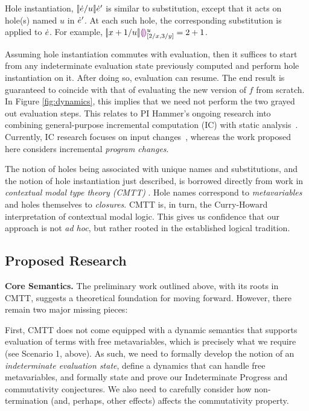 Hole instantiation, $[\!| \dot{e} / u |\!]\dot{e}'$ is similar to substitution, except that it acts on
 hole(s) named $u$ in $\dot{e}'$. At each such hole, the corresponding substitution is applied to $\dot{e}$. For example,
$[\!| x + 1 / u |\!]\textcolor{violet}{\llparenthesis}\textcolor{violet}{\rrparenthesis}{}^u_{[2/x, 3/y]} = 2 + 1$. 

Assuming hole instantiation commutes with evaluation, then it suffices to start from any indeterminate evaluation 
state previously computed and perform hole instantiation on it. After doing so, evaluation can resume. The end result is guaranteed to coincide with that of evaluating the new version of $f$ from scratch. In Figure \ref{fig:dynamics}, this implies that we need not perform the two grayed out evaluation steps. This relates to PI Hammer's
ongoing research into combining general-purpose incremental
computation (IC) with static analysis~\cite{OVV2016}. 
%
Currently, IC research focuses on input
changes~\citep{TypedAdapton2016, Fisher2016, Hammer2015, Chen2014,
Hammer2014, Chen2011, Hammer2011, Hammer2009, Hammer2008}, whereas the
work proposed here considers incremental \emph{program changes}.

The notion of holes being associated with unique names and substitutions, and the notion of hole instantiation just described, is borrowed directly from work in \emph{contextual modal type theory (CMTT)} \cite{Nanevski2008}. Hole names correspond to \emph{metavariables} and holes themselves to \emph{closures}. CMTT is, in turn, the Curry-Howard interpretation of contextual modal logic. This gives us confidence that our approach is not \emph{ad hoc}, but rather rooted in the established logical tradition.

\subsection{Proposed Research}

\noindent\textbf{Core Semantics.} The preliminary work outlined above, with its roots in CMTT, suggests a theoretical foundation for moving forward. However, there remain two major missing pieces:

First, CMTT does not come equipped with a dynamic semantics that supports evaluation of terms with free metavariables, which is precisely what we require (see Scenario 1, above). As such, we need to formally develop the notion of an \emph{indeterminate evaluation state}, define a dynamics that can handle free metavariables, and formally state and prove our Indeterminate Progress and commutativity conjectures. We also need to carefully consider how non-termination (and, perhaps, other effects) affects the commutativity property.

